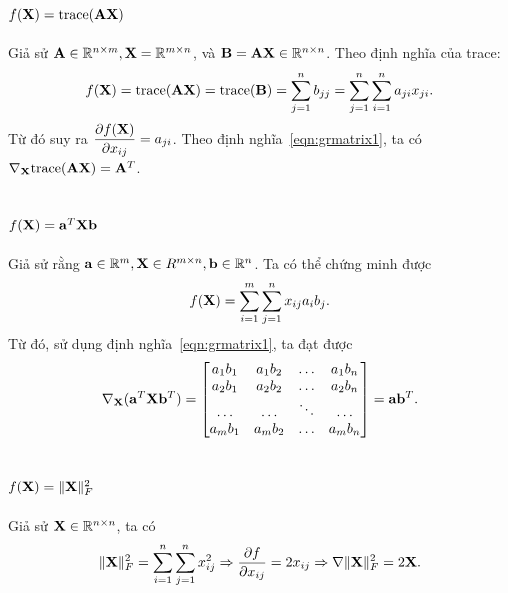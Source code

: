 \subsection{$f(\mathbf{X}) = \text{trace}(\mathbf{A}\mathbf{X})$}
Giả sử $\mathbf{A} \in \mathbb{R}^{n\times m}, \mathbf{X} = \mathbb{R}^{m\times n}$, và $\mathbf{B} = \mathbf{A}\mathbf{X} \in \mathbb{R}^
{n \times n}$. Theo định nghĩa của trace:
\begin{equation}
f(\mathbf{X}) = \text{trace}(\mathbf{A}\mathbf{X}) = \text{trace}(\mathbf{B}) = \sum_{j = 1}^n {b_{jj}} =
\sum_{j=1}^n\sum_{i=1}^n a_{ji}x_{ji}.
\end{equation}
Từ đó suy ra $\displaystyle\frac{\partial f(\mathbf{X})}{\partial x_{ij}} =
a_{ji}$. Theo định nghĩa~\eqref{eqn:grmatrix1}, ta có $\nabla_{\mathbf{X}}\text{trace}(\mathbf{A}\mathbf{X}) =
\mathbf{A}^T$.

\subsection{$f(\mathbf{X}) = \mathbf{a}^T\mathbf{X}\mathbf{b}$}
Giả sử rằng $\mathbf{a} \in \mathbb{R}^{m}, \mathbf{X} \in R^{m\times n}, \mathbf{b} \in \mathbb{R}^{n}$. Ta có
thể chứng minh được $$f(\mathbf{X}) = \sum_{i=1}^m \sum_{j=1}^n x_{ij}a_ib_j.$$
Từ đó, sử dụng định nghĩa~\eqref{eqn:grmatrix1}, ta đạt được
\begin{equation}
\nabla_{\mathbf{X}}(\mathbf{a}^T\mathbf{X}\mathbf{b}^T) = \left[\begin{matrix}
a_1b_1 &  a_1b_2 & \dots &a_1b_n \\
a_2b_1 &  a_2b_2 & \dots &a_2b_n \\
\dots & \dots & \ddots & \dots \\
a_mb_1 &  a_mb_2 & \dots &a_mb_n \\
\end{matrix}\right]
= \mathbf{a}\mathbf{b}^T.
\end{equation}


\subsection{$f(\mathbf{X}) = \|\mathbf{X}\|_F^2$}
Giả sử $\mathbf{X} \in \mathbb{R}^{n\times n}$, ta có
$$
\|\mathbf{X}\|_F^2 =
\sum_{i=1}^n\sum_{j=1}^n x_{ij}^2 \Rightarrow \frac{\partial f}{\partial x_{ij}} = 2x_{ij} \Rightarrow \nabla \|\mathbf{X}\|_F^2 = 2\mathbf{X}.
$$


